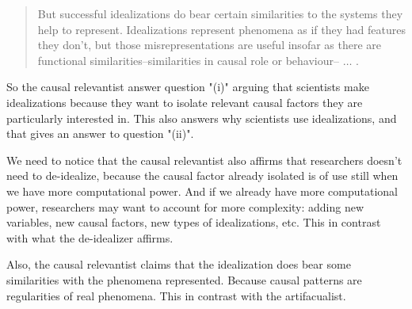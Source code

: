 \begin{quote}
	But successful idealizations do bear certain similarities to the systems they help to represent.
	Idealizations represent phenomena as if they had features they don't, but those misrepresentations are useful insofar as there are functional similarities--similarities in causal role or behaviour-- $\ldots$ \parencite[][p. 53]{Potochnik2017-POTIAT-3}.
\end{quote}

So the causal relevantist answer question "(i)" arguing that scientists make idealizations because they want to isolate relevant causal factors they are particularly interested in.
This also answers why scientists use idealizations, and that gives an answer to question "(ii)".

We need to notice that the causal relevantist also affirms that researchers doesn't need to de-idealize, because the causal factor already isolated is of use still when we have more computational power.
And if we already have more computational power, researchers may want to account for more complexity: adding new variables, new causal factors, new types of idealizations, etc.
This in contrast with what the de-idealizer affirms.

Also, the causal relevantist claims that the idealization does bear some similarities with the phenomena represented.
Because causal patterns are regularities of real phenomena.
This in contrast with the artifacualist.





